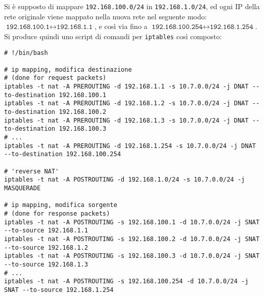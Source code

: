 Si è supposto di mappare \texttt{192.168.100.0/24} in \texttt{192.168.1.0/24},
ed ogni IP della rete originale viene mappato nella nuova rete nel seguente
modo: $\texttt{192.168.100.1} \leftrightarrow \texttt{192.168.1.1}$, e così via
fino a $\texttt{192.168.100.254} \leftrightarrow \texttt{192.168.1.254}$.
Si produce quindi uno script di comandi per \texttt{iptables} così composto:
\begin{verbatim}
# !/bin/bash

# ip mapping, modifica destinazione
# (done for request packets)
iptables -t nat -A PREROUTING -d 192.168.1.1 -s 10.7.0.0/24 -j DNAT --to-destination 192.168.100.1
iptables -t nat -A PREROUTING -d 192.168.1.2 -s 10.7.0.0/24 -j DNAT --to-destination 192.168.100.2
iptables -t nat -A PREROUTING -d 192.168.1.3 -s 10.7.0.0/24 -j DNAT --to-destination 192.168.100.3
# ...
iptables -t nat -A PREROUTING -d 192.168.1.254 -s 10.7.0.0/24 -j DNAT --to-destination 192.168.100.254

# 'reverse NAT'
iptables -t nat -A POSTROUTING -d 192.168.1.0/24 -s 10.7.0.0/24 -j MASQUERADE

# ip mapping, modifica sorgente
# (done for response packets)
iptables -t nat -A POSTROUTING -s 192.168.100.1 -d 10.7.0.0/24 -j SNAT --to-source 192.168.1.1
iptables -t nat -A POSTROUTING -s 192.168.100.2 -d 10.7.0.0/24 -j SNAT --to-source 192.168.1.2
iptables -t nat -A POSTROUTING -s 192.168.100.3 -d 10.7.0.0/24 -j SNAT --to-source 192.168.1.3
# ...
iptables -t nat -A POSTROUTING -s 192.168.100.254 -d 10.7.0.0/24 -j SNAT --to-source 192.168.1.254
\end{verbatim}
